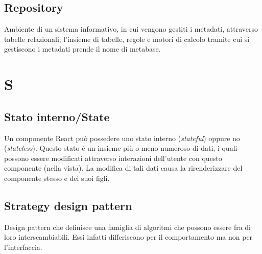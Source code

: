 \subsection*{Repository}
Ambiente di un sistema informativo, in cui vengono gestiti i metadati, attraverso tabelle relazionali; l'insieme di tabelle, regole e motori di calcolo tramite cui si gestiscono i metadati prende il nome di metabase.

\section*{S}
\subsection*{Stato interno/State}
Un componente React può possedere uno stato interno (\textit{stateful}) oppure no (\textit{stateless}). Questo stato è un insieme più o meno numeroso di dati, i quali possono essere modificati attraverso interazioni dell'utente con questo componente (nella vista). La modifica di tali dati causa la rirenderizzare del componente stesso e dei suoi figli. 

\subsection*{Strategy design pattern}
Design pattern che definisce una famiglia di algoritmi che possono essere fra di loro interscambiabili. Essi infatti differiscono per il comportamento ma non per l'interfaccia. 
